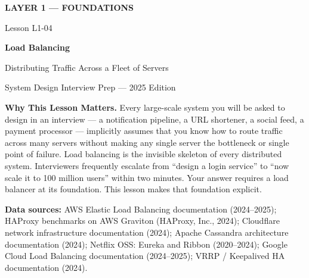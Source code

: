 \documentclass[11pt,a4paper]{article}
\begin{document}
\begin{titlepage}
  \thispagestyle{empty}
  \vspace*{2cm}
  \begin{center}
    {\small\color{highlight}\textbf{LAYER 1 --- FOUNDATIONS}}\par
    \vspace{0.4cm}
    {\small\color{primary!60}Lesson L1-04}\par
    \vspace{1.2cm}
    {\LARGE\bfseries\color{primary} Load Balancing}\par
    \vspace{0.5cm}
    {\large\color{primary!70} Distributing Traffic Across a Fleet of Servers}\par
    \vspace{0.4cm}
    {\small\color{primary!50} System Design Interview Prep --- 2025 Edition}\par
    \vspace{2.2cm}

    \begin{insightbox}
      \textbf{Why This Lesson Matters.} Every large-scale system you will be asked to design in
      an interview --- a notification pipeline, a URL shortener, a social feed, a payment processor
      --- implicitly assumes that you know how to route traffic across many servers without making
      any single server the bottleneck or single point of failure. Load balancing is the invisible
      skeleton of every distributed system. Interviewers frequently escalate from ``design a login
      service'' to ``now scale it to 100 million users'' within two minutes. Your answer requires
      a load balancer at its foundation. This lesson makes that foundation explicit.
    \end{insightbox}

    \vspace{1.4cm}
    {\small\color{primary!50}
      \textbf{Data sources:} AWS Elastic Load Balancing documentation (2024--2025);
      HAProxy benchmarks on AWS Graviton (HAProxy, Inc., 2024);
      Cloudflare network infrastructure documentation (2024);
      Apache Cassandra architecture documentation (2024);
      Netflix OSS: Eureka and Ribbon (2020--2024);
      Google Cloud Load Balancing documentation (2024--2025);
      VRRP / Keepalived HA documentation (2024).
    }\par
  \end{center}
\end{titlepage}
\end{document}
